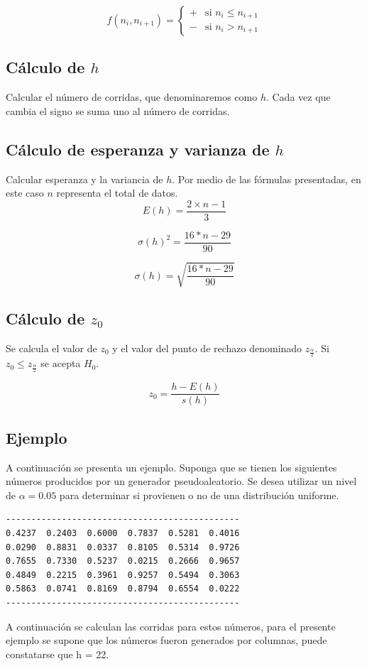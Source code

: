 $$
f(n_i,n_{i+1}) = \begin{cases}
+ & \text{si } n_i \leq n_{i+1} \\
- & \text{si } n_i > n_{i+1} 
\end{cases}
$$

\subsection{Cálculo de $h$}
Calcular el número de corridas, que denominaremos como $h$. Cada vez que cambia el signo se suma uno al número de corridas.

\subsection{Cálculo de esperanza y varianza de $h$}
Calcular esperanza y la variancia de $h$. Por medio de las fórmulas presentadas, en este caso $n$ representa el total de datos.
$$E(h) = \frac{2\times n -1}{3}$$

$$\sigma(h)^2 = \frac{16*n-29}{90}$$

$$\sigma(h) = \sqrt{\frac{16*n-29}{90}}$$

\subsection{Cálculo de $z_0$}
Se calcula el valor de $z_0$ y el valor del punto de rechazo denominado  $z_\frac{\alpha}{2}$. Si $z_0 \leq z_\frac{\alpha}{2} $ se acepta $H_0$.

$$z_0 = \frac{h-E(h)}{s(h)}$$

\subsection{Ejemplo}
A continuación se presenta un ejemplo. Suponga que se tienen los siguientes números producidos por un generador pseudoaleatorio. Se desea utilizar un nivel de $\alpha = 0.05$ para determinar si provienen o no de una distribución uniforme.
\begin{verbatim}
----------------------------------------------
0.4237  0.2403  0.6000  0.7837  0.5281  0.4016
0.0290  0.8831  0.0337  0.8105  0.5314  0.9726
0.7655  0.7330  0.5237  0.0215  0.2666  0.9657
0.4849  0.2215  0.3961  0.9257  0.5494  0.3063
0.5863  0.0741  0.8169  0.8794  0.6554  0.0222
----------------------------------------------
\end{verbatim}
A continuación se calculan las corridas para estos números, para el presente ejemplo se supone que los números fueron generados por columnas, puede constatarse que h = 22.


